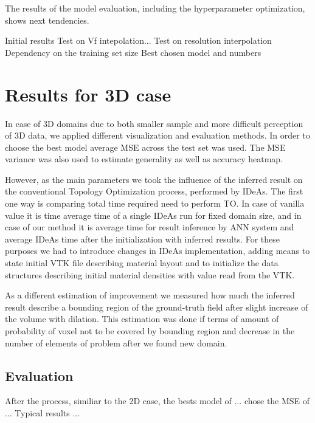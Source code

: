 The results of the model evaluation, including the hyperparameter optimization,  shows next tendencies. 

Initial results
Test on Vf intepolation...
Test on resolution interpolation
Dependency on the training set size 
Best chosen model and numbers

\section{Results for 3D case}

In case of 3D domains due to both smaller sample and more difficult perception of 3D data, we applied different visualization and evaluation methods.
In order to choose the best model average MSE across the test set was used.
The MSE variance was also used to estimate generality as well as accuracy heatmap.

However, as the main parameters we took the influence of the inferred result on the conventional Topology Optimization process, performed by IDeAs.
The first one way is comparing total time required need to perform TO. 
In case of vanilla value it is time average time of a single IDeAs run for fixed domain size, and in case of our method it is average time for result inference by ANN system and average IDeAs time after the initialization with inferred results. For these purposes we had to introduce changes in IDeAs implementation, adding means to state initial VTK file describing material layout and to initialize the data structures describing initial material densities with value read from the VTK.

As a different estimation of improvement we measured how much the inferred result describe a bounding region of the ground-truth field after slight increase of the volume with dilation.
This estimation was done if terms of amount of probability of voxel not to be covered by bounding region and decrease in the number of elements of problem  after we found new domain. 

\subsection{Evaluation}

After the process, similiar to the 2D case, the bests model of ...
chose the MSE of ...
Typical results ...
 


